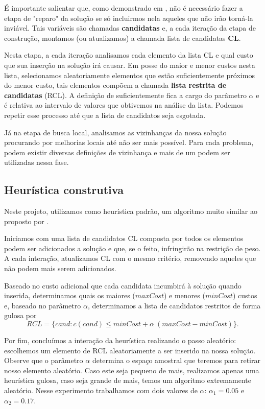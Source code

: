 \documentclass[11pt]{article}
\begin{document}
É importante salientar que, como demonstrado em \cite{rezende19_grasp}, não é necessário fazer a etapa de "reparo" da solução se só incluirmos nela aqueles que não irão torná-la inviável. Tais variáveis são chamadas \textbf{candidatas} e, a cada iteração da etapa de construção, montamos (ou atualizamos) a chamada lista de candidatas \textbf{CL}.

Nesta etapa, a cada iteração analisamos cada elemento da lista CL e qual custo que sua inserção na solução irá causar. Em posse do maior e menor custos nesta lista, selecionamos aleatoriamente elementos que estão suficientemente próximos do menor custo, tais elementos compõem a chamada \textbf{lista restrita de candidatas} (RCL). A definição de suficientemente fica a cargo do parâmetro \textbf{\(\alpha\)} e é relativa ao intervalo de valores que obtivemos na análise da lista. Podemos repetir esse processo até que a lista de candidatos seja esgotada.

Já na etapa de busca local, analisamos as vizinhanças da nossa solução procurando por melhorias locais até não ser mais possível. Para cada problema, podem existir diversas definições de vizinhança e mais de um podem ser utilizadas nessa fase.

\subsection*{Heurística construtiva}
\label{sec:orge28a9ab}
Neste projeto, utilizamos como heurística padrão, um algoritmo muito similar ao proposto por \cite{rezende19_grasp}.

Iniciamos com uma lista de candidatos CL composta por todos os elementos podem ser adicionados a solução e que, se o feito, infringirão na restrição de peso. A cada interação, atualizamos CL com o mesmo critério, removendo aqueles que não podem mais serem adicionados.

Baseado no custo adicional que cada candidata incumbirá à solução quando inserida, determinamos quais os maiores (\(maxCost\)) e menores (\(minCost\)) custos e, baseado no parâmetro \(\alpha\), determinamos a lista de candidatos restritos de forma gulosa por
\[ RCL = \{ cand : c(cand) \leq minCost + \alpha \ (maxCost - minCost) \}. \]

Por fim, concluímos a interação da heurística realizando o passo aleatório: escolhemos um elemento de RCL aleatoriamente a ser inserido na nossa solução. Observe que o parâmetro \(\alpha\) determina o espaço amostral que teremos para retirar nosso elemento aleatório. Caso este seja pequeno de mais, realizamos apenas uma heurística gulosa, caso seja grande de mais, temos um algoritmo extremamente aleatório. Nesse experimento trabalhamos com dois valores de \(\alpha\): \(\alpha_{1} = 0.05\) e \(\alpha_{2} = 0.17\).
\end{document}
